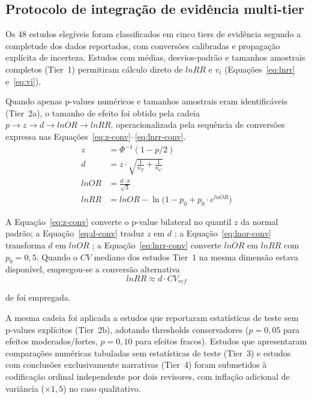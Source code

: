\documentclass[12pt,a4paper]{article}
\begin{document}
\subsection{Protocolo de integração de evidência multi-tier}
\label{sec:multitier}

Os 48 estudos elegíveis foram classificados em cinco tiers de evidência segundo a completude dos dados reportados, com conversões calibradas e propagação explícita de incerteza. Estudos com médias, desvios-padrão e tamanhos amostrais completos (Tier~1) permitiram cálculo direto de $lnRR$ e $v_i$ (Equações~\ref{eq:lnrr} e~\ref{eq:vi}).

Quando apenas p-values numéricos e tamanhos amostrais eram identificáveis (Tier~2a), o tamanho de efeito foi obtido pela cadeia $p \rightarrow z \rightarrow d \rightarrow lnOR \rightarrow lnRR$, operacionalizada pela sequência de conversões expressa nas Equações~\ref{eq:z-conv}--\ref{eq:lnrr-conv}.
%
\begin{align}
z &= \Phi^{-1}(1 - p/2) \label{eq:z-conv} \\
d &= z \cdot \sqrt{\frac{1}{n_T} + \frac{1}{n_C}} \label{eq:d-conv} \\
lnOR &= \frac{d \cdot \pi}{\sqrt{3}} \label{eq:lnor-conv} \\
lnRR &= lnOR - \ln\!\bigl(1 - p_0 + p_0 \cdot e^{lnOR}\bigr) \label{eq:lnrr-conv}
\end{align}

\noindent A Equação~\ref{eq:z-conv} converte o p-value bilateral no quantil $z$ da normal padrão; a Equação~\ref{eq:d-conv} traduz $z$ em $d$ \citep{Borenstein2009}; a Equação~\ref{eq:lnor-conv} transforma $d$ em $lnOR$ \citep{Hasselblad1995}; a Equação~\ref{eq:lnrr-conv} converte $lnOR$ em $lnRR$ \citep{Zhang1998} com $p_0 = 0{,}5$. Quando o $CV$ mediano dos estudos Tier~1 na mesma dimensão estava disponível, empregou-se a conversão alternativa
%
\begin{equation}
lnRR \approx d \cdot CV_{ref}
\label{eq:lnrr-cv}
\end{equation}

\noindent de \citet{Lajeunesse2011} foi empregada.

A mesma cadeia foi aplicada a estudos que reportaram estatísticas de teste sem p-values explícitos (Tier~2b), adotando thresholds conservadores ($p = 0{,}05$ para efeitos moderados/fortes, $p = 0{,}10$ para efeitos fracos). Estudos que apresentaram comparações numéricas tabuladas sem estatísticas de teste (Tier~3) e estudos com conclusões exclusivamente narrativas (Tier~4) foram submetidos à codificação ordinal independente por dois revisores, com inflação adicional de variância ($\times 1{,}5$) no caso qualitativo.
\end{document}
